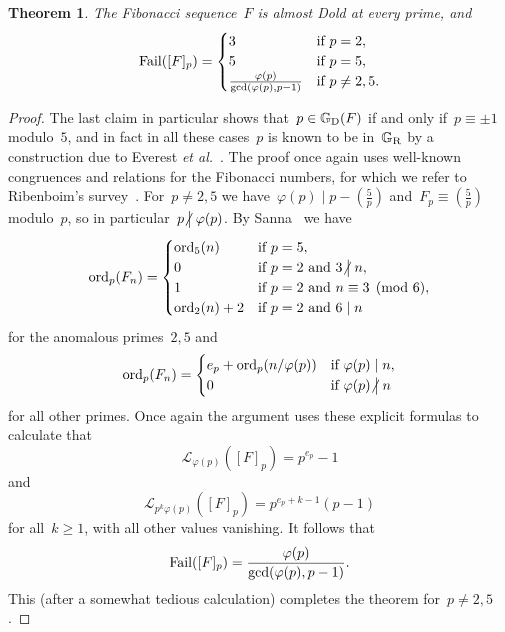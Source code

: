 \documentclass[]{interact}
\theoremstyle{plain}
\numberwithin{equation}{section} %
\newtheorem{theorem}[thm]{Theorem}
\numberwithin{table}{section} %
\numberwithin{figure}{section}
\def\gooddoldprimes{\mathbb{G}_{\rm{D}}}
\def\goodrealizableprimes{\mathbb{G}_{\rm{R}}}
\newcommand\ord{{\rm{ord}}}
\newcommand\failure{{\rm{Fail}}}
\newcommand\least{{\mathcal{L}}}
\newcommand\notdivides{\mathrel{\kern-3pt\not\!\kern4.3pt\bigm|}}
\newcommand\divides\mid
\def\ge{\geqslant}
\begin{document}
\begin{theorem}\label{theoremFibonacci}
The Fibonacci sequence~$F$ is almost Dold at every prime,
and
\[
\failure([F]_p)
=
\begin{cases}
3&\mbox{if }p=2,\\
5&\mbox{if }p=5,\\
\frac{\varphi(p)}{\gcd(\varphi(p),p-1)}&\mbox{if $p\neq2,5$}.
\end{cases}
\]
\end{theorem}

\begin{proof}
The last claim in particular shows that~$p\in\gooddoldprimes(F)$ if and only
if~$p\equiv\pm1$ modulo~$5$, and in fact in all these cases~$p$
is known to be in~$\goodrealizableprimes$
by a construction due to Everest {\it{et al.}}~\cite[Th.~2.6]{MR1938222}.
The proof once again uses
well-known congruences and relations for the Fibonacci numbers,
for which we refer to Ribenboim's survey~\cite{MR1352481}.
For~$p\neq2,5$ we have~$\varphi(p)\divides p-(\tfrac{5}{p})$
and~$F_p\equiv(\frac{5}{p})$ modulo~$p$, so
in particular~$p\notdivides\varphi(p)$.
By Sanna~\cite{MR3512829} we have
\begin{equation}\label{fibonacci2part}
\ord_p(F_n)
=
\begin{cases}
\ord_5(n)&\mbox{if }p=5,\\
0&\mbox{if $p=2$ and $3\notdivides n$},\\
1&\mbox{if $p=2$ and $n\equiv3\pmod{6}$},\\
\ord_2(n)+2&\mbox{if $p=2$ and $6\divides n$}
\end{cases}
\end{equation}
for the anomalous primes~$2,5$ and
\begin{align*}
\ord_p(F_n)
=
\begin{cases}
e_p+\ord_p(n/\varphi(p))&\mbox{if }\varphi(p)\divides n,\\
0&\mbox{if }\varphi(p)\notdivides n
\end{cases}
\end{align*}
for all other primes.
Once again the argument uses these explicit formulas to
calculate that
\[
\least_{\varphi(p)}([F]_p)=p^{e_p}-1
\]
and
\[
\least_{p^k\varphi(p)}([F]_p)=p^{e_p+k-1}(p-1)
\]
for all~$k\ge1$, with all other values vanishing. It follows that
\[
\failure([F]_p)
=
\frac{\varphi(p)}{\gcd(\varphi(p),p-1)}.
\]
This (after a somewhat tedious calculation)
completes the theorem for~$p\neq2,5$.


\end{proof}
\end{document}
